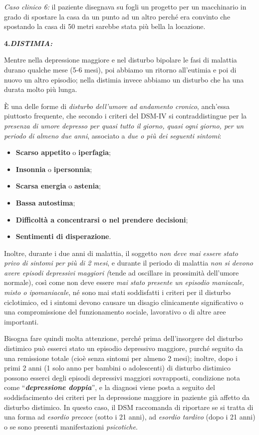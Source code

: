 \documentclass[]{article}
\begin{document}
\emph{Caso clinico 6:} il paziente disegnava su fogli un progetto per un
macchinario in grado di spostare la casa da un punto ad un altro perché
era convinto che spostando la casa di 50 metri sarebbe stata più bella
la locazione.

\textbf{4.\emph{DISTIMIA:}}

Mentre nella depressione maggiore e nel disturbo bipolare le fasi di
malattia durano qualche mese (5-6 mesi), poi abbiamo un ritorno
all'eutimia e poi di nuovo un altro episodio; nella distimia invece
abbiamo un disturbo che ha una durata molto più lunga.

È una delle forme di \emph{disturbo dell'umore ad andamento cronico},
anch'essa piuttosto frequente, che secondo i criteri del DSM-IV si
contraddistingue per la \emph{presenza di umore depresso per quasi tutto
il giorno, quasi ogni giorno, per un periodo di almeno due anni},
associato a \emph{due o più dei seguenti sintomi}:

\begin{itemize}
\item
  \textbf{Scarso appetito} o \textbf{iperfagia};
\item
  \textbf{Insonnia} o \textbf{ipersonnia};
\item
  \textbf{Scarsa energia} o \textbf{astenia};
\item
  \textbf{Bassa autostima};
\item
  \textbf{Difficoltà a concentrarsi o nel prendere decisioni};
\item
  \textbf{Sentimenti di disperazione}.
\end{itemize}

Inoltre, durante i due anni di malattia, il soggetto \emph{non deve mai
essere stato privo di sintomi per più di 2 mesi}, e durante il periodo
di malattia \emph{non si devono avere episodi depressivi maggiori
(}tende ad oscillare in prossimità dell'umore normale), così come non
deve essere \emph{mai stato presente un episodio maniacale, misto o
ipomaniacale}, né sono mai stati soddisfatti i criteri per il disturbo
ciclotimico, ed i sintomi devono causare un disagio clinicamente
significativo o una compromissione del funzionamento sociale, lavorativo
o di altre aree importanti.

Bisogna fare quindi molta attenzione, perché prima dell'insorgere del
disturbo distimico può esserci stato un episodio depressivo maggiore,
purché seguito da una remissione totale (cioè senza sintomi per almeno 2
mesi); inoltre, dopo i primi 2 anni (1 solo anno per bambini o
adolescenti) di disturbo distimico possono esserci degli episodi
depressivi maggiori sovrapposti, condizione nota come
``\textbf{\emph{depressione doppia}}'', e la diagnosi viene posta a
seguito del soddisfacimento dei criteri per la depressione maggiore in
paziente già affetto da disturbo distimico. In questo caso, il DSM
raccomanda di riportare se si tratta di una forma ad \emph{esordio
precoce} (sotto i 21 anni), ad \emph{esordio tardivo} (dopo i 21 anni) o
se sono presenti manifestazioni \emph{psicotiche}.
\end{document}
